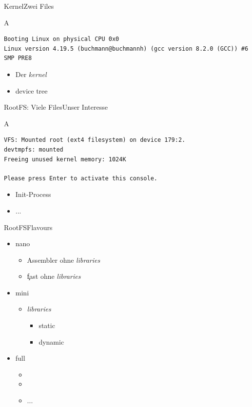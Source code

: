 \documentclass{beamer}
\begin{document}
\begin{frame}[fragile]{Kernel}{Zwei Files}
\begin{block}{A}
{
\tiny
\begin{verbatim}
Booting Linux on physical CPU 0x0					       
Linux version 4.19.5 (buchmann@buchmannh) (gcc version 8.2.0 (GCC)) #6 SMP PRE8
\end{verbatim}
}
\end{block}
\begin{itemize}
 \item {} Der {\em kernel}
 \item {} device tree
 \end{itemize}
\end{frame}

\begin{frame}[fragile]{RootFS: Viele Files}{Unser Interesse}
\begin{block}{A}
{
\tiny
\begin{verbatim}
VFS: Mounted root (ext4 filesystem) on device 179:2.
devtmpfs: mounted
Freeing unused kernel memory: 1024K

Please press Enter to activate this console. 
\end{verbatim}
}
\end{block}
\begin{itemize}
 \item {} Init-Process
 \item ...
\end{itemize}

\end{frame}

\begin{frame}{RootFS}{Flavours}
 \begin{itemize}
  \item nano
  \begin{itemize}
   \item Assembler ohne {\em libraries} 
   \item \c fast ohne {\em libraries} 
  \end{itemize}
  \item mini
  \begin{itemize}
   \item {\em libraries}
   \begin{itemize}
    \item static
    \item dynamic
   \end{itemize}
  \end{itemize}
  \item full
  \begin{itemize}
   \item {}
   \item {}
   \item ...
  \end{itemize}
 \end{itemize}
\end{frame}




\end{document}
